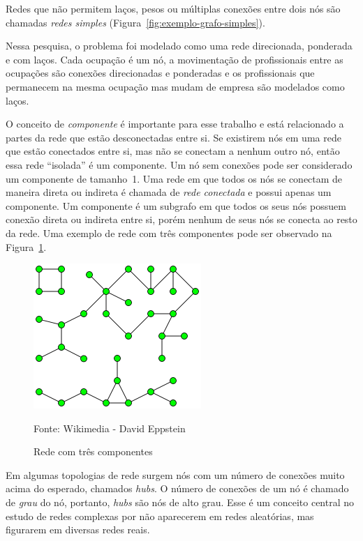 \documentclass[12pt,a4paper]{article}
\newcommand{\source}[1]{\vspace{-10pt} \caption*{Fonte: {#1}} }
\begin{document}
Redes que não permitem laços, pesos ou múltiplas conexões entre dois nós são chamadas \textit{redes simples} (Figura~\ref{fig:exemplo-grafo-simples}).

Nessa pesquisa, o problema foi modelado como uma rede direcionada, ponderada e com laços. Cada ocupação é um nó, a movimentação de profissionais entre as ocupações são conexões direcionadas e ponderadas e os profissionais que permanecem na mesma ocupação mas mudam de empresa são modelados como laços.

O conceito de \textit{componente} é importante para esse trabalho e está relacionado a partes da rede que estão desconectadas entre si. Se existirem nós em uma rede que estão conectados entre si, mas não se conectam a nenhum outro nó, então essa rede \enquote{isolada} é um componente. Um nó sem conexões pode ser considerado um componente de tamanho~1. Uma rede em que todos os nós se conectam de maneira direta ou indireta é chamada de \textit{rede conectada} e possui apenas um componente. Um componente é um subgrafo em que todos os seus nós possuem conexão direta ou indireta entre si, porém nenhum de seus nós se conecta ao resto da rede. Uma exemplo de rede com três componentes pode ser observado na Figura~\ref{fig:exemplo-componente}.

\begin{figure}[ht]
    \centering
    \includegraphics[scale=0.7]{componente.png}
    \caption{Rede com três componentes}
    \source{Wikimedia - David Eppstein}
    \label{fig:exemplo-componente}
\end{figure}

Em algumas topologias de rede surgem nós com um número de conexões muito acima do esperado, chamados \textit{hubs}. O número de conexões de um nó é chamado de \textit{grau} do nó, portanto, \textit{hubs} são nós de alto grau. Esse é um conceito central no estudo de redes complexas por não aparecerem em redes aleatórias, mas figurarem em diversas redes reais.
\end{document}
